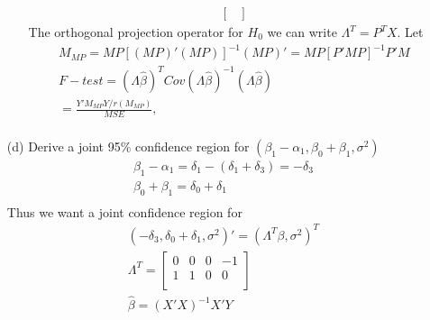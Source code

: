 \begin{itemize}
\begin{itemize}
\[\begin{split}
\begin{bmatrix}
         \end{bmatrix}
    \end{split}
    \]    
    The orthogonal projection operator for $H_0$ we can write $\Lambda^T = P^T X$. Let 
    \[ 
    \begin{split}
    M_{MP} = MP[(MP)'(MP)]^{-1} (MP)' = MP[P'MP]^{-1}P'M \\
    F-test = (\Lambda \hat{\beta})^TCov(\Lambda \hat{\beta})^{-1}(\Lambda \hat{\beta})\\
     = \frac{Y'M_{MP}Y/r(M_{MP})}{MSE},\\
    \end{split}
    \] 
    \end{itemize}
    
    \item[(d)] Derive a joint 95$\%$ confidence region for $(\beta_1-\alpha_1, \beta_0+\beta_1, \sigma^2)$\\
     \[ 
    \begin{split}
    \beta_1-\alpha_1 = \delta_1 - (\delta_1+\delta_3) = -\delta_3\\
    \beta_0 + \beta_1 = \delta_0 + \delta_1\\
    \end{split}
    \]    
    Thus we want a joint confidence region for 
     \[ 
    \begin{split}
    (-\delta_3, \delta_0+\delta_1, \sigma^2)' = (\Lambda^T\beta, \sigma^2)^T\\
    \Lambda^T = \begin{bmatrix}
           0 & 0& 0 & -1 \\
           1 & 1 & 0 & 0\\
         \end{bmatrix}\\
    \hat{\beta} = (X'X)^{-1}X'Y
    \end{split}
    \]     
    

\end{itemize}
